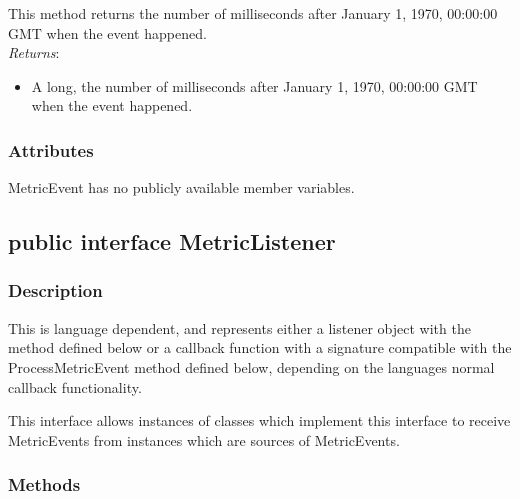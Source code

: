 \documentclass[$Date: 2003/06/26 19:29:31 $]{glabarticle}
\begin{document}
This method returns the number of milliseconds after January 1, 1970, 00:00:00 GMT when the event
happened. \\

\textit{Returns}:
\begin{itemize}
\item[] A long, the number of milliseconds after January 1, 1970, 00:00:00 GMT when the event happened.
\end{itemize}




\subsubsection{Attributes}

MetricEvent has no publicly available member variables. 


\newpage

\subsection{public interface MetricListener}


\subsubsection{Description}

This is language dependent, and represents either a listener object
with the method defined below or a callback function with a signature
compatible with the ProcessMetricEvent method defined below, depending
on the languages normal callback functionality.

This interface allows instances of classes which implement this
interface to receive MetricEvents from instances which are sources of
MetricEvents.


\subsubsection{Methods}
\end{document}
